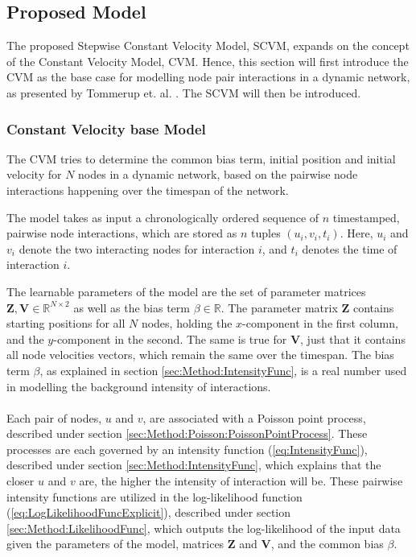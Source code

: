 \subsection{Proposed Model}
\label{sec:Method:ProposedModel}
The proposed Stepwise Constant Velocity Model, SCVM, expands on the concept of the Constant Velocity Model, CVM. 
Hence, this section will first introduce the CVM as the base case for modelling node pair interactions in a dynamic network, as presented by Tommerup et. al. \cite{Tommerup2021LearningNetworks}. 
The SCVM will then be introduced. 


\subsubsection{Constant Velocity base Model}
\label{sec:Method:ProposedModel:ConstantVelocityModel}
The CVM tries to determine the common bias term, initial position and initial velocity for $N$ nodes in a dynamic network, based on the pairwise node interactions happening over the timespan of the network.

The model takes as input a chronologically ordered sequence of $n$ timestamped, pairwise node interactions, which are stored as $n$ tuples $(u_i, v_i, t_i)$.
Here, $u_i$ and $v_i$ denote the two interacting nodes for interaction $i$, and $t_i$ denotes the time of interaction $i$.

The learnable parameters of the model are the set of parameter matrices $\textbf{Z}, \textbf{V} \in \mathbb{R} ^{N \times 2}$ as well as the bias term $\beta \in \mathbb{R}$.
The parameter matrix $\textbf{Z}$ contains starting positions for all $N$ nodes, holding the $x$-component in the first column, and the $y$-component in the second.
The same is true for $\textbf{V}$, just that it contains all node velocities vectors, which remain the same over the timespan.
The bias term $\beta$, as explained in section \ref{sec:Method:IntensityFunc}, is a real number used in modelling the background intensity of interactions.
\\\\
Each pair of nodes, $u$ and $v$, are associated with a Poisson point process, described under section \ref{sec:Method:Poisson:PoissonPointProcess}.
These processes are each governed by an intensity function (\ref{eq:IntensityFunc}), described under section \ref{sec:Method:IntensityFunc}, which explains that the closer $u$ and $v$ are, the higher the intensity of interaction will be. 
These pairwise intensity functions are utilized in the log-likelihood function (\ref{eq:LogLikelihoodFuncExplicit}), described under section \ref{sec:Method:LikelihoodFunc}, which outputs the log-likelihood of the input data given the parameters of the model, matrices $\textbf{Z}$ and $\textbf{V}$, and the common bias $\beta$.

